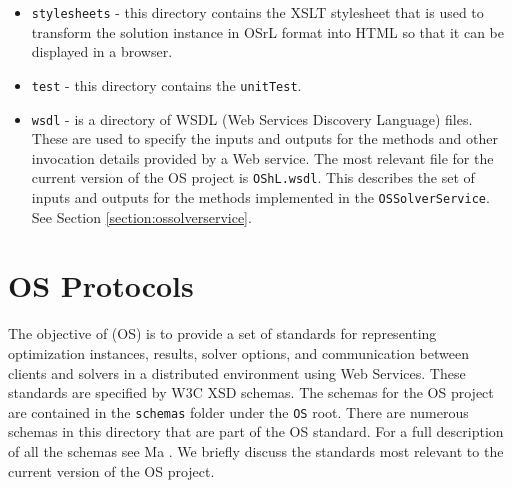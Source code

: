 \documentclass[11pt]{article}
\renewcommand{\_}{{\char"5F}}
\renewcommand{\{}{{\char"7B}}
\renewcommand{\}}{{\char"7D}}
\renewcommand{\^}{{\char"0D}}
\renewcommand{\'}{{\char"0D}}
\begin{document}
\begin{itemize}
\item {\tt stylesheets} - this directory contains the XSLT stylesheet that is used to transform the solution instance in OSrL format into HTML so that it can be displayed in a browser.

\item {\tt test} - this directory contains the {\tt unitTest}.


\item  {\tt wsdl} - is a directory of WSDL (Web Services Discovery Language) files. These are used to specify the inputs and outputs for the methods and other invocation details provided by a Web service. The most relevant file for the current version of the OS project is {\tt OShL.wsdl}.  This describes the set of inputs and outputs for the methods implemented in the {\tt OSSolverService}. See Section \ref{section:ossolverservice}.

\end{itemize}


\section{OS Protocols}\label{section:schemadescriptions}



The objective of  (OS) is to provide a set of standards for representing optimization instances, results, solver options, and communication between clients and solvers in a distributed environment using Web Services.  These standards are specified by W3C XSD schemas. The schemas for the OS project are contained in the {\tt schemas} folder under the {\tt OS} root. There are numerous schemas in this directory that are part of the OS standard. For a full description of all the schemas see  Ma \cite{junma2005}.  We briefly discuss the standards most relevant to the current version of the OS project.
\end{document}
